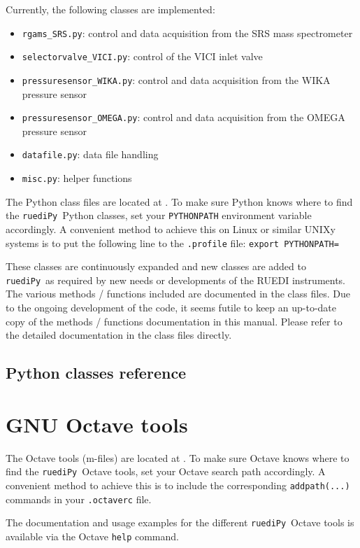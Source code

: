 \documentclass[12pt]{article}   	%
\newcommand{\ruediPy}{\texttt{ruediPy}}
\begin{document}
Currently, the following classes are implemented:
\begin{itemize}
\item \texttt{rgams\_SRS.py}: control and data acquisition from the SRS mass spectrometer
\item \texttt{selectorvalve\_VICI.py}: control of the VICI inlet valve
\item \texttt{pressuresensor\_WIKA.py}: control and data acquisition from the WIKA pressure sensor
\item \texttt{pressuresensor\_OMEGA.py}: control and data acquisition from the OMEGA pressure sensor
\item \texttt{datafile.py}: data file handling
\item \texttt{misc.py}: helper functions
\end{itemize}


The Python class files are located at . To make sure Python knows where to find the \ruediPy\ Python classes, set your \texttt{PYTHONPATH} environment variable accordingly. A convenient method to achieve this on Linux or similar UNIXy systems is to put the following line to the \texttt{.profile} file: 
 \texttt{export PYTHONPATH=}

These classes are continuously expanded and new classes are added to \ruediPy\ as required by new needs or developments of the RUEDI instruments. The various methods / functions included are documented in the class files. Due to the ongoing development of the code, it seems futile to keep an up-to-date copy of the methods / functions documentation in this manual. Please refer to the detailed documentation in the class files directly.

\subsection{Python classes reference}


\section{GNU Octave tools}
The Octave tools (m-files) are located at . To make sure Octave knows where to find the \ruediPy\ Octave tools, set your Octave search path accordingly. A convenient method to achieve this is to include the corresponding \texttt{addpath(...)} commands in your \texttt{.octaverc} file.

The documentation and usage examples for the different \ruediPy\ Octave tools is available via the Octave \texttt{help} command.


\end{document}
